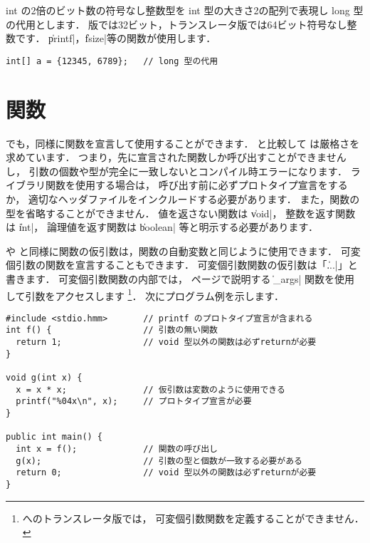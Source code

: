 int の2倍のビット数の符号なし整数型を
int 型の大きさ2の配列で表現し long 型の代用とします．
{\tac}版では32ビット，トランスレータ版では64ビット符号なし整数です．
\|printf|，\|fsize|等の関数が使用します．

\begin{mylist}
\begin{verbatim}
int[] a = {12345, 6789};   // long 型の代用
\end{verbatim}
\end{mylist}



\section{関数}
\label{chap3:func}
\cmml でも，\cl 同様に関数を宣言して使用することができます．
\cl と比較して \cmml は厳格さを求めています．
つまり，先に宣言された関数しか呼び出すことができませんし，
引数の個数や型が完全に一致しないとコンパイル時エラーになります．
ライブラリ関数を使用する場合は，
呼び出す前に必ずプロトタイプ宣言をするか，
適切なヘッダファイルをインクルードする必要があります．
また，関数の型を省略することができません．
値を返さない関数は \|void|，
整数を返す関数は \|int|，
論理値を返す関数は \|boolean| 等と明示する必要があります．

\cl や \javal と同様に関数の仮引数は，関数の自動変数と同じように使用できます．
可変個引数の関数を宣言することもできます．
可変個引数関数の仮引数は「\|...|」と書きます．
可変個引数関数の内部では，
\pageref{chap4:args}ページで説明する
\|_args| 関数を使用して引数をアクセスします
\footnote{\cl へのトランスレータ版では，
可変個引数関数を定義することができません．}．
次にプログラム例を示します．

\begin{mylist}
\begin{verbatim}
#include <stdio.hmm>       // printf のプロトタイプ宣言が含まれる
int f() {                  // 引数の無い関数
  return 1;                // void 型以外の関数は必ずreturnが必要
}

void g(int x) {
  x = x * x;               // 仮引数は変数のように使用できる
  printf("%04x\n", x);     // プロトタイプ宣言が必要
}

public int main() {
  int x = f();             // 関数の呼び出し
  g(x);                    // 引数の型と個数が一致する必要がある
  return 0;                // void 型以外の関数は必ずreturnが必要
}
\end{verbatim}
\end{mylist}

